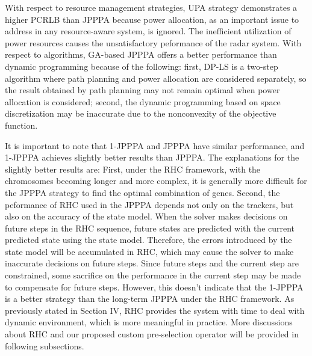 \documentclass[12pt,journal,draftclsnofoot,onecolumn]{IEEEtran}
\begin{document}
With respect to resource management strategies, UPA strategy demonstrates a higher PCRLB than JPPPA because power allocation, as an important issue to address in any resource-aware system, is ignored. The inefficient utilization of power resources causes the unsatisfactory peformance of the radar system. With respect to algorithms, GA-based JPPPA offers a better performance than dynamic programming because of the following: first, DP-LS is a two-step algorithm where path planning and power allocation are considered separately, so the result obtained by path planning may not remain optimal when power allocation is considered; second, the dynamic programming based on space discretization may be inaccurate due to the nonconvexity of the objective function. 

It is important to note that 1-JPPPA and JPPPA have similar performance, and 1-JPPPA achieves slightly better results than JPPPA. The explanations for the slightly better results are: First, under the RHC framework, with the chromosomes becoming longer and more complex, it is generally more difficult for the JPPPA strategy to find the optimal combination of genes. Second, the peformance of RHC used in the JPPPA depends not only on the trackers, but also on the accuracy of the state model. %
When the solver makes decisions on future steps in the RHC sequence, future states are predicted with the current predicted state using the state model. Therefore, the errors introduced by the state model will be accumulated in RHC, which may cause the solver to make inaccurate decisions on future steps. Since future steps and the current step are constrained, some sacrifice on the performance in the current step may be made to compensate for future steps. However, this doesn't indicate that the 1-JPPPA is a better strategy than the long-term JPPPA under the RHC framework. As previously stated in Section IV, RHC provides the system with time to deal with dynamic environment, which is more meaningful in practice. More discussions about RHC and our proposed custom pre-selection operator will be provided in following subsections.
\end{document}

